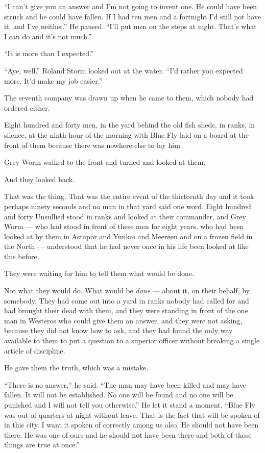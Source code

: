 “I can’t give you an answer and I’m not going to invent one. He could have been struck and he could have fallen. If I had ten men and a fortnight I’d still not have it, and I’ve neither.” He paused. “I’ll put men on the steps at night. That’s what I can do and it’s not much.”

“It is more than I expected.”

“Aye, well.” Roland Storm looked out at the water. “I’d rather you expected more. It’d make my job easier.”

\sceneBreak

The seventh company was drawn up when he came to them, which nobody had ordered either.

Eight hundred and forty men, in the yard behind the old fish sheds, in ranks, in silence, at the ninth hour of the morning with Blue Fly laid on a board at the front of them because there was nowhere else to lay him.

Grey Worm walked to the front and turned and looked at them.

And they looked back.

That was the thing. That was the entire event of the thirteenth day and it took perhaps ninety seconds and no man in that yard said one word. Eight hundred and forty Unsullied stood in ranks and looked at their commander, and Grey Worm — who had stood in front of these men for eight years, who had been looked at by them in Astapor and Yunkai and Meereen and on a frozen field in the North — understood that he had never once in his life been looked at like this before.

They were waiting for him to tell them what would be done.

Not what they would do. What would be \textit{done} — about it, on their behalf, by somebody. They had come out into a yard in ranks nobody had called for and had brought their dead with them, and they were standing in front of the one man in Westeros who could give them an answer, and they were not asking, because they did not know how to ask, and they had found the only way available to them to put a question to a superior officer without breaking a single article of discipline.

He gave them the truth, which was a mistake.

“There is no answer,” he said. “The man may have been killed and may have fallen. It will not be established. No one will be found and no one will be punished and I will not tell you otherwise.” He let it stand a moment. “Blue Fly was out of quarters at night without leave. That is the fact that will be spoken of in this city. I want it spoken of correctly among us also. He should not have been there. He was one of ours and he should not have been there and both of those things are true at once.”

